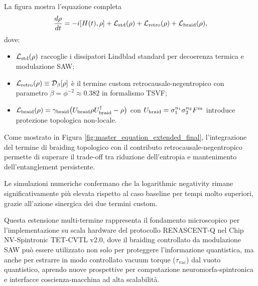 \documentclass[11pt,a4paper]{article}
\let\oldref\ref
\renewcommand{\ref}{\protect\oldref}
\theoremstyle{plain}
\theoremstyle{definition}
\begin{document}
\begin{tcolorbox}[colback=blue!3!white, colframe=blue!80!black,
                  title={Master Equation Estesa con Termini Retrocausale-Negentropico e Braiding Topologico},
                  fonttitle=\bfseries, 
                  boxrule=1.2pt, 
                  arc=4pt, 
                  left=6pt, right=6pt, top=8pt, bottom=8pt]

La figura mostra l'equazione completa
\begin{equation}
\frac{d\rho}{dt} = -i [H(t),\rho] + \mathcal{L}_{\rm std}(\rho) + \mathcal{L}_{\rm retro}(\rho) + \mathcal{L}_{\rm braid}(\rho),
\label{eq:master_full}
\end{equation}
dove:
\begin{itemize}
    \item $\mathcal{L}_{\rm std}(\rho)$ raccoglie i dissipatori Lindblad standard per decoerenza termica e modulazione SAW;
    \item $\mathcal{L}_{\rm retro}(\rho) \equiv \mathcal{D}_\beta[\rho]$ è il termine custom retrocausale-negentropico con parametro $\beta = \phi^{-2} \approx 0.382$ in formalismo TSVF;
    \item $\mathcal{L}_{\rm braid}(\rho) = \gamma_{\rm braid} \bigl( U_{\rm braid} \rho U_{\rm braid}^\dagger - \rho \bigr)$ con $U_{\rm braid} = \sigma_1^{n_1} \sigma_2^{n_2} F^{m}$ introduce protezione topologica non-locale.
\end{itemize}

\end{tcolorbox}




\clearpage





Come mostrato in Figura \ref{fig:master_equation_extended_final}, l’integrazione del termine di braiding topologico con il contributo retrocausale-negentropico permette di superare il trade-off tra riduzione dell’entropia e mantenimento dell’entanglement persistente. 


\vspace{0.3cm}


Le simulazioni numeriche confermano che la logarithmic negativity rimane significativamente più elevata rispetto al caso baseline per tempi molto superiori, grazie all’azione sinergica dei due termini custom. 


\vspace{0.5cm}

Questa estensione multi-termine rappresenta il fondamento microscopico per l'implementazione su scala hardware del protocollo RENASCENT-Q nel Chip NV-Spintronic TET-CVTL v2.0, dove il braiding controllato da modulazione SAW può essere utilizzato non solo per proteggere l'informazione quantistica, ma anche per estrarre in modo controllato vacuum torque ($\tau_{\text{vac}}$) dal vuoto quantistico, aprendo nuove prospettive per computazione neuromorfa-spintronica e interfacce coscienza-macchina ad alta scalabilità.
\end{document}
